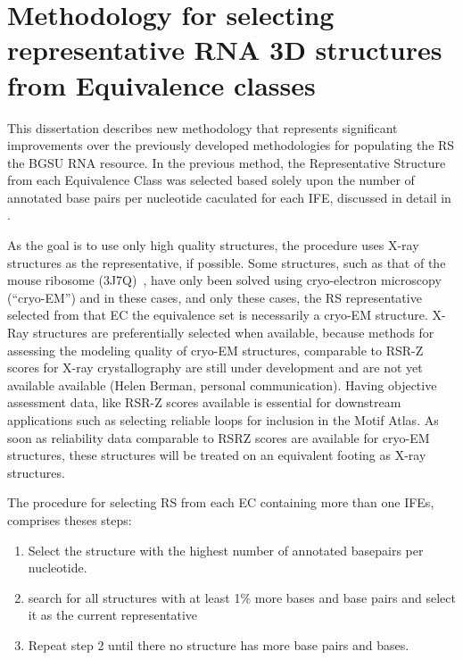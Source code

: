 \section{Methodology for selecting representative RNA 3D structures from
Equivalence classes}

This dissertation describes new methodology that represents significant
improvements over the previously developed methodologies for populating the RS
the BGSU RNA resource. In the previous method, the Representative Structure from
each Equivalence Class was selected based solely upon the number of annotated
base pairs per nucleotide caculated for each IFE, discussed in detail in
\cite{Leontis2012b}.

As the goal is to use only high quality structures, the procedure uses X-ray
structures as the representative, if possible. Some structures, such as that of
the mouse ribosome (3J7Q)~\cite{Voorhees2014}, have only been solved using
cryo-electron microscopy (``cryo-EM'') and in these cases, and only these cases,
the RS representative selected from that EC the equivalence set is necessarily a
cryo-EM structure. X-Ray structures are preferentially selected when available,
because methods for assessing the modeling quality of cryo-EM structures,
comparable to RSR-Z scores for X-ray crystallography are still under development
and are not yet available available (Helen Berman, personal communication).
Having objective assessment data, like RSR-Z scores available is essential for
downstream applications such as selecting reliable loops for inclusion in the
Motif Atlas. As soon as reliability data comparable to RSRZ scores are available
for cryo-EM structures, these structures will be treated on an equivalent
footing as X-ray structures.

The procedure for selecting RS from each EC containing more than one IFEs,
comprises theses steps:

\begin{enumerate}
  \item Select the structure with the highest number of annotated basepairs per
    nucleotide.

  \item search for all structures with at least 1\% more bases and base pairs and select
    it as the current representative

  \item Repeat step 2 until there no structure has more base pairs and bases.
\end{enumerate}

